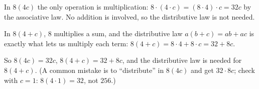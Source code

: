 In $8(4c)$ the only operation is multiplication: $8\cdot(4\cdot c)=(8\cdot4)\cdot c=32c$ by the associative law. No addition is involved, so the distributive law is not needed.

In $8(4+c)$, $8$ multiplies a sum, and the distributive law $a(b+c)=ab+ac$ is exactly what lets us multiply each term: $8(4+c)=8\cdot4+8\cdot c=32+8c$.

So $8(4c)=\boxed{32c}$, $8(4+c)=\boxed{32+8c}$, and the distributive law is needed for $8(4+c)$. (A common mistake is to ``distribute'' in $8(4c)$ and get $32\cdot8c$; check with $c=1$: $8(4\cdot1)=32$, not $256$.)

